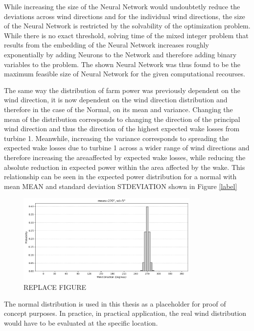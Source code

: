 While increasing the size of the Neural Network would undoubtetly reduce the deviations across wind directions and for the individual wind directions, the size of the Neural Network is restricted by the solvability of the optimization problem. While there is no exact threshold, solving time of the mixed integer problem that results from the embedding of the Neural Network increases roughly exponentially by adding Neurons to the Network and therefore adding binary variables to the problem. The shown Neural Network was thus found to be the maximum feasible size of Neural Network for the given computational recourses. 


The same way the distribution of farm power was previously dependent on the wind direction, it is now dependent on the wind direction distribution and therefore in the case of the Normal, on its mean and variance. Changing the mean of the distribution corresponds to changing the direction of the principal wind direction and thus the direction of the highest expected wake losses from turbine 1. Meanwhile, increasing the variance corresponds to spreading the expected wake losses due to turbine 1 across a wider range of wind directions and therefore increasing the areaaffected by expected wake losses, while reducing the absolute reduction in expected power within the area affected by the wake. This relationship can be seen in the expected power distribution for a normal with mean MEAN and standard deviation STDEVIATION shown in Figure \ref{label}


\begin{figure}[h] 
	\centering
	\includegraphics[width=0.8\textwidth]{figures/optimization/wind_dist_opti.png} 
	\caption{REPLACE FIGURE }
	\label{fig:wind_dist_opti}
\end{figure}


The normal distribution is used in this thesis as a placeholder for proof of concept purposes. In practice, in practical application, the real wind distribution would have to be evaluated at the specific location. 

